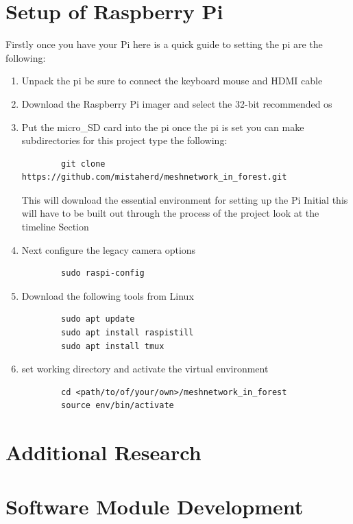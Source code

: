 \section{Setup of Raspberry Pi}
Firstly once you have  your Pi here is a  quick  guide to setting the pi are  the following:
\begin{enumerate}
    \item Unpack the  pi be sure  to  connect the keyboard mouse  and HDMI cable
    \item Download the Raspberry Pi imager and  select the 32-bit recommended os 
    \item Put the  micro\_SD card  into  the pi once the  pi is set you can make subdirectories for this project type the  following:
    \begin{verbatim}
        git clone https://github.com/mistaherd/meshnetwork_in_forest.git
    \end{verbatim}
    This  will download the essential environment for  setting up the  Pi Initial this will have to be built out  through the  process of  the   project look at the timeline Section
    \item Next configure the legacy camera  options
    \begin{verbatim}
        sudo raspi-config
    \end{verbatim}
    \item Download the following tools from Linux
    \begin{verbatim}
        sudo apt update
        sudo apt install raspistill
        sudo apt install tmux
    \end{verbatim}
    \item set working directory and activate the virtual environment
    \begin{verbatim}
        cd <path/to/of/your/own>/meshnetwork_in_forest
        source env/bin/activate
    \end{verbatim}
\end{enumerate}
\section{Additional  Research}

\section{Software Module Development}

\newpage

